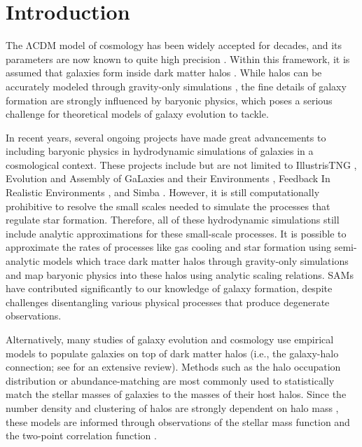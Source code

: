 \documentclass[twocolumn,twocolappendix]{aastex63}
\newcommand{\lcdm}{$\mathrm{\Lambda}$CDM}
\begin{document}
\section{Introduction}


The \lcdm{} model of cosmology has been widely accepted for decades, and its parameters are now known to quite high precision \citep{Planck:2018}. Within this framework, it is assumed that galaxies form inside dark matter halos \citep{White:Rees:1978, Blumenthal:1984}.
While halos can be accurately modeled through gravity-only simulations \citep[e.g., Bolshoi-Planck;][]{Klypin:2016}, the fine details of galaxy formation are strongly influenced by baryonic physics, which poses a serious challenge for theoretical models of galaxy evolution to tackle.

In recent years, several ongoing projects have made great advancements to including baryonic physics in hydrodynamic simulations of galaxies in a cosmological context. These projects include but are not limited to IllustrisTNG \citep{Nelson:2019}, Evolution and Assembly of GaLaxies and their Environments \citep[EAGLE;][]{Schaye:2015, Crain:2015}, Feedback In Realistic Environments \citep[FIRE;][]{Hopkins:2018}, and Simba \citep{Dave:2019}. However, it is still computationally prohibitive to resolve the small scales needed to simulate the processes that regulate star formation. Therefore, all of these hydrodynamic simulations still include analytic approximations for these small-scale processes. It is possible to approximate the rates of processes like gas cooling and star formation using semi-analytic models \citep[SAMs; e.g.,][]{White:Frenk:1991, Somerville:2015} which trace dark matter halos through gravity-only simulations and map baryonic physics into these halos using analytic scaling relations. SAMs have contributed significantly to our knowledge of galaxy formation, despite challenges disentangling various physical processes that produce degenerate observations.

Alternatively, many studies of galaxy evolution and cosmology use empirical models to populate galaxies on top of dark matter halos (i.e., the galaxy-halo connection; see \citealt{Wechsler:Tinker:2018} for an extensive review). Methods such as the halo occupation distribution \citep[HOD; e.g.,][]{Berlind:Weinberg:2002, Zheng:2007, Hearin:2016} 
or abundance-matching \citep[e.g.,][]{Kravtsov:2004, Hearin:Watson:2013} 
are most commonly used to statistically match the stellar masses of galaxies to the masses of their host halos. Since the number density and clustering of halos are strongly dependent on halo mass \citep{Press:Schechter:1974, Kaiser:1984, Bond:1991, Mo:White:1996, Zentner:2007}, 
these models are informed through observations of the stellar mass function and the two-point correlation function \citep{Zehavi:2005, Reddick:2013, Wang:2019}.
\end{document}
